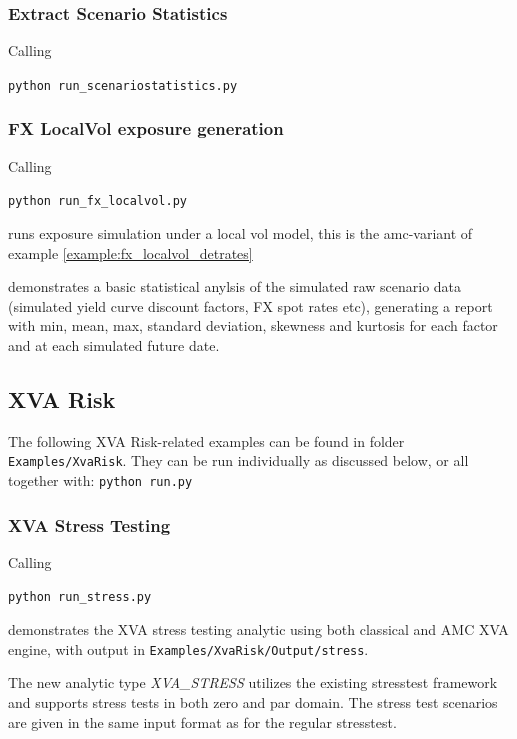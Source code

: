 \subsubsection{Extract Scenario Statistics}

Calling

\medskip
\centerline {\tt python run\_scenariostatistics.py}

\subsubsection{FX LocalVol exposure generation}

Calling

\medskip
\centerline {\tt python run\_fx\_localvol.py}

runs exposure simulation under a local vol model, this is the amc-variant of example \ref{example:fx_localvol_detrates}


\medskip
demonstrates a basic statistical anylsis of the simulated raw scenario data (simulated yield curve discount factors, FX spot rates etc), generating a report
with min, mean, max, standard deviation, skewness and kurtosis for each factor and at each simulated future date.

\subsection{XVA Risk}\label{example:xvarisk}

The following XVA Risk-related examples can be found in folder {\tt Examples/XvaRisk}.
They can be run individually as discussed below, or all together with: {\tt python run.py}

\subsubsection{XVA Stress Testing}\label{example:xvarisk_stress}

Calling

\medskip
\centerline {\tt python run\_stress.py}

\medskip
demonstrates the XVA stress testing analytic using both classical and AMC XVA engine,
with output in {\tt Examples/XvaRisk/Output/stress}.

The new analytic type \emph{XVA\_STRESS} utilizes the existing stresstest framework and supports
stress tests in both zero and par domain.
The stress test scenarios are given in the same input format as for the regular stresstest.

